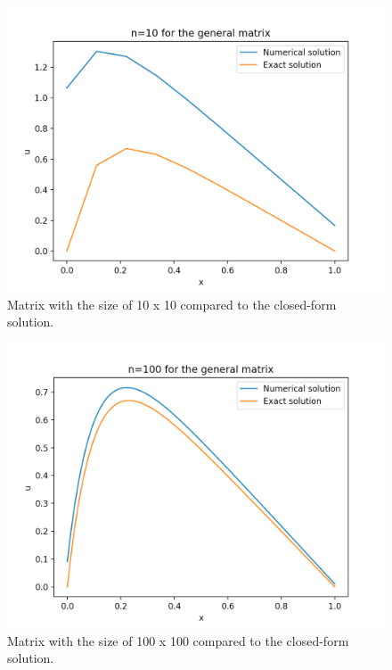 \documentclass[%
oneside,                 %
final,                   %
10pt]{article}
\begin{document}
\begin{figure}[H]
  \includegraphics[scale=0.45]{figur1b_10.png}
  \centering
  \caption{Matrix with the size of 10 x 10 compared to the closed-form solution.}
  \label{1b_10}
\end{figure}
\begin{figure}[H]
  \includegraphics[scale=0.45]{figur1b_100.png}
  \caption{Matrix with the size of 100 x 100 compared to the closed-form solution.}
  \label{1b_100}
\end{figure}
\end{document}
